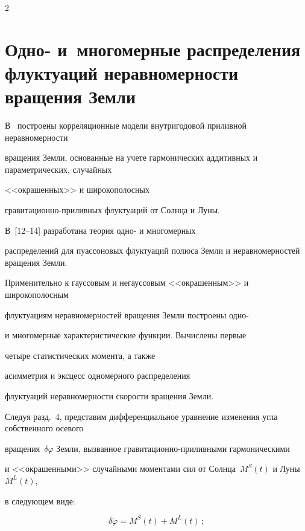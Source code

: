 \begin{multicols}{2}
\section{Одно- и~многомерные распределения флуктуаций неравномерности вращения Земли}





В~\cite{10-mar} построены корреляционные  модели внут\-ри\-го\-до\-вой приливной неравномерности


вращения Земли, основанные на учете гармонических аддитивных и параметрических, случайных  


<<окрашенных>>  и широкополосных


гра\-ви\-та\-ци\-он\-но-при\-лив\-ных флуктуаций  от Солнца и Луны. 


В~[12--14] разработана теория одно- и многомерных


распределений для пуассоновых флуктуаций полюса Земли и неравномерностей вращения Земли.


 Применительно к гауссовым и негауссовым <<окрашенным>> и широкополосным


флуктуациям не\-рав\-но\-мер\-ностей вращения Земли построены одно-


и многомерные характеристические функции. Вычислены первые 


четыре статистических момента, а также


асим\-мет\-рия и эксцесс одномерного распределения 


флуктуаций неравномерности скорости вращения Земли.





Следуя разд.~4, представим дифференциальное уравнение изменения угла собственного осевого


вращения~$\delta\varphi$ Земли, вызванное гра\-ви\-та\-ци\-он\-но-при\-лив\-ны\-ми гармоническими


и <<окрашенными>>  случайными  моментами сил от Солнца~$M^S(t)$ и Луны~$M^L (t)$, 


в следующем виде:


\begin{equation}


\delta \ddot\varphi = M^S (t) +M^L(t)\,;\label{e31-mar}


\end{equation}


    


    \noindent



\end{multicols}

